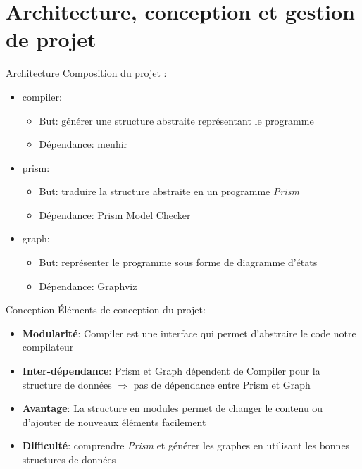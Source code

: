 \documentclass[11pt]{beamer}
\begin{document}
\section{Architecture, conception et gestion de projet}
\begin{frame}{Architecture}
Composition du projet :
\begin{itemize}
  \item compiler: %
  \begin{itemize}
    \item But: générer une structure abstraite représentant le programme
    \item Dépendance: menhir
  \end{itemize}
  \item prism: %
  \begin{itemize}
    \item But: traduire la structure abstraite en un programme \textit{Prism}
    \item Dépendance: Prism Model Checker
  \end{itemize}
  \item graph: %
  \begin{itemize}
    \item But: représenter le programme sous forme de diagramme d'états
    \item Dépendance: Graphviz
  \end{itemize}
\end{itemize}
\end{frame}

\begin{frame}{Conception}
Éléments de conception du projet:
\begin{itemize}
  \item \textbf{Modularité}: Compiler est une interface qui permet d'abstraire le code notre compilateur
  \item \textbf{Inter-dépendance}: Prism et Graph dépendent de Compiler pour la structure de données $\Rightarrow$ pas de dépendance entre Prism et Graph
  \item \textbf{Avantage}: La structure en modules permet de changer le contenu ou d'ajouter de nouveaux éléments facilement
  \item \textbf{Difficulté}: comprendre \textit{Prism} et générer les graphes en utilisant les bonnes structures de données
\end{itemize}
\end{frame}
\end{document}
